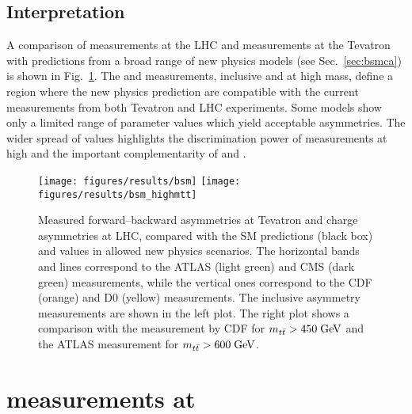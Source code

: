 \subsection{Interpretation}

A comparison of \ac{} measurements at the LHC and \afb{} measurements
at the Tevatron with predictions from a broad range of new physics models
(see Sec.~\ref{sec:bsmca}) is shown in Fig.~\ref{fig:summarybsm}. The
\ac{} and \afb{} measurements, inclusive and at high \mtt{} mass,
define a region where the new physics prediction are compatible with
the current measurements from both Tevatron and LHC experiments.
Some models show only a limited range of parameter values which yield
acceptable asymmetries. The wider spread of \ac{} values highlights
the discrimination power of measurements at high \mtt{} and the
important complementarity of \ac{} and \afb{}. 

\begin{figure}[!htb]
  \centering
  \texttt{[image: figures/results/bsm]}
  \texttt{[image: figures/results/bsm\_highmtt]}
  \caption{Measured forward--backward asymmetries \afb{} at Tevatron
    and charge asymmetries \ac{} at LHC, compared with the SM
    predictions (black box) and values in allowed new physics
    scenarios. The horizontal bands and lines correspond to the ATLAS
    (light green) and CMS (dark green) measurements, while the
    vertical ones correspond to the CDF (orange) and D0 (yellow)
    measurements. The inclusive asymmetry measurements are shown in
    the left plot. The right plot shows a comparison with the \afb{}
    measurement by CDF for $m_{t\bar{t}}{} > 450 \; \mathrm{GeV}{}$ and the ATLAS \ac{}
    measurement for $m_{t\bar{t}}{} > 600 \; \mathrm{GeV}{}$.}
  \label{fig:summarybsm}
\end{figure}


\section{\ac{} measurements at \eighttev{}}
\label{sec:res8tev}

